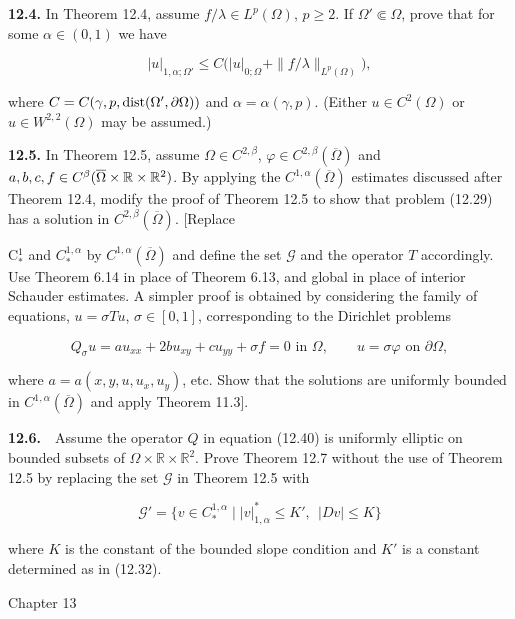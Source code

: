 \medskip

\noindent\textbf{12.4.} In Theorem 12.4, assume $f/\lambda\in L^p(\Omega)$, $p\geq 2$. If $\Omega'\Subset\Omega$, prove that for some $\alpha\in(0,1)$ we have

\[
|u|_{1,\alpha;\Omega'}\leq C\bigl(|u|_{0;\Omega}+\|f/\lambda\|_{L^p(\Omega)}\bigr),
\]

where $C=C(\gamma,p,\operatorname{dist}(\Omega',\partial\Omega))$ and $\alpha=\alpha(\gamma,p)$. (Either $u\in C^2(\Omega)$ or $u\in W^{2,2}(\Omega)$ may be assumed.)

\medskip

\noindent\textbf{12.5.} In Theorem 12.5, assume $\Omega\in C^{2,\beta}$, $\varphi\in C^{2,\beta}(\overline{\Omega})$ and $a,b,c,f\in C^{\beta}(\overline{\Omega}\times\mathbb{R}\times\mathbb{R}^2)$. By applying the $C^{1,\alpha}(\overline{\Omega})$ estimates discussed after Theorem 12.4, modify the proof of Theorem 12.5 to show that problem (12.29) has a solution in $C^{2,\beta}(\overline{\Omega})$. [Replace


C$^1_*$ and $C^{1,\alpha}_*$ by $C^{1,\alpha}(\overline{\Omega})$ and define the set $\mathcal{G}$ and the operator $T$ accordingly.
Use Theorem 6.14 in place of Theorem 6.13, and global in place of interior
Schauder estimates. A simpler proof is obtained by considering the family of
equations, $u=\sigma Tu$, $\sigma\in[0,1]$, corresponding to the Dirichlet problems

\[
Q_\sigma u = au_{xx}+2bu_{xy}+cu_{yy}+\sigma f = 0 \text{ in } \Omega,\qquad u=\sigma\varphi \text{ on } \partial\Omega,
\]

where $a=a(x,y,u,u_x,u_y)$, etc. Show that the solutions are uniformly bounded in
$C^{1,\alpha}(\overline{\Omega})$ and apply Theorem 11.3].

\textbf{12.6.}\ \ Assume the operator $Q$ in equation (12.40) is uniformly elliptic on bounded
subsets of $\Omega\times\mathbb{R}\times\mathbb{R}^2$. Prove Theorem 12.7 without the use of Theorem 12.5
by replacing the set $\mathcal{G}$ in Theorem 12.5 with

\[
\mathcal{G}'=\{v\in C^{1,\alpha}_* \mid |v|^{*}_{1,\alpha}\leq K',\ \ |Dv|\leq K\}
\]

where $K$ is the constant of the bounded slope condition and $K'$ is a constant
determined as in (12.32).


Chapter 13

